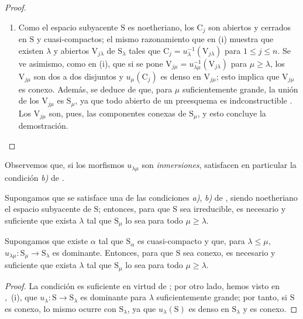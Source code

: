 \begin{proof}
\begin{enumerate}[label=(\roman*)]
  \item Como el espacio subyacente $\mathrm{S}$ es noetheriano, los $\mathrm{C}_j$ son abiertos y cerrados en $\mathrm{S}$ y cuasi-compactos; el mismo razonamiento que en (i) muestra que existen $\lambda$ y abiertos $\mathrm{V}_{j\lambda}$ de $\mathrm{S}_\lambda$ tales que $\mathrm{C}_j=u_\lambda^{-1}(\mathrm{V}_{j\lambda})$ para $1\leqslant j\leqslant n$.
Se ve asimismo, como en (i), que si se pone $\mathrm{V}_{j\mu}=u_{\lambda\mu}^{-1}(\mathrm{V}_{j\lambda})$ para $\mu\geqslant\lambda$, los $\mathrm{V}_{j\mu}$ son dos a dos disjuntos y $u_\mu(\mathrm{C}_j)$ es denso en $\mathrm{V}_{j\mu}$; esto implica que $\mathrm{V}_{j\mu}$ es conexo.
Además, se deduce de  que, para $\mu$ suficientemente grande, la unión de los $\mathrm{V}_{j\mu}$ es $\mathrm{S}_\mu$, ya que todo abierto de un preesquema es indconstructible .
Los $\mathrm{V}_{j\mu}$ son, pues, las componentes conexas de $\mathrm{S}_\mu$, y esto concluye la demostración.
\end{enumerate}
\end{proof}

Observemos que, si los morfismos $u_{\lambda\mu}$ son \emph{inmersiones}, satisfacen en particular la condición \emph{b)} de .

\begin{corollary}[8.4.3]
\label{IV.8.4.3}
Supongamos que se satisface una de las condiciones \emph{a)}, \emph{b)} de , siendo noetheriano el espacio subyacente de $\mathrm{S}$; entonces, para que $\mathrm{S}$ sea irreducible, es necesario y suficiente que exista $\lambda$ tal que $\mathrm{S}_\mu$ lo sea para todo $\mu\geqslant\lambda$.
\end{corollary}

\begin{proposition}[8.4.4]
\label{IV.8.4.4}
Supongamos que existe $\alpha$ tal que $\mathrm{S}_\alpha$ es cuasi-compacto y que, para $\lambda\leqslant\mu$, $u_{\lambda\mu}:\mathrm{S}_\mu\to\mathrm{S}_\lambda$ es dominante.
Entonces, para que $\mathrm{S}$ sea conexo, es necesario y suficiente que exista $\lambda$ tal que $\mathrm{S}_\mu$ lo sea para todo $\mu\geqslant\lambda$.
\end{proposition}

\begin{proof}
La condición es suficiente en virtud de ; por otro lado, hemos visto en ,~(i), que $u_\lambda:\mathrm{S}\to\mathrm{S}_\lambda$ es dominante para $\lambda$ suficientemente grande; por tanto, si $\mathrm{S}$ es conexo, lo mismo ocurre con $\mathrm{S}_\lambda$, ya que $u_\lambda(\mathrm{S})$ es denso en $\mathrm{S}_\lambda$ y es conexo.
\end{proof}

